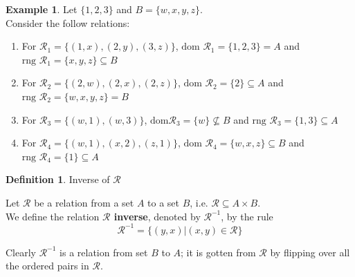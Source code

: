 \documentclass{book}
\theoremstyle{definition}
\newtheorem{definition}{Definition}[section]
\newtheorem{example}{Example}[definition]
\theoremstyle{remark}
\newcommand{\cc}[1]{\mathcal{#1}}
\begin{document}
    \begin{example}
        Let $\{ 1,2,3 \}$ and $B = \{w,x,y,z \}$. \\
        
        Consider the follow relations: 
            \begin{enumerate}
                \item For $\cc{R}_1 = \{ (1,x), (2,y), (3,z) \}$, $\text{dom } \cc{R}_1 = \{1, 2, 3 \} = A$ and $\text{rng } \cc{R}_1 = \{x, y, z \} \subseteq B$
                
                \item For $\cc{R}_2 = \{ (2,w), (2,x), (2,z) \}$, $\text{dom } \cc{R}_2 = \{2 \} \subseteq A$ and $\text{rng } \cc{R}_2 = \{w, x, y, z \} = B$
                
                \item For $\cc{R}_3 = \{ (w,1), (w,3) \}$, $\text{dom} \cc{R}_3 = \{w \} \nsubseteq B$ and $\text{rng } \cc{R}_3 = \{1, 3 \} \subseteq A$ 
                
                \item For $\cc{R}_4 = \{ (w,1), (x,2), (z,1) \}$, $\text{dom } \cc{R}_4 = \{w, x, z \} \subseteq B$ and $\text{rng } \cc{R}_4 = \{1 \} \subseteq A$
            \end{enumerate}
                
    \end{example}


    \begin{definition} 
        Inverse of $\cc{R}$ \\
        
        \begin{tcolorbox}      
            Let $\cc{R}$ be a relation from a set $A$ to a set $B$, i.e. $\cc{R} \subseteq A \times B$. \\
            We define the relation \textbf{$\cc{R}$ inverse}, denoted by $\cc{R}^{-1}$, by the rule
                \begin{equation*}
                    \cc{R}^{-1} = \{ (y,x) | (x,y) \in \cc{R} \}
                \end{equation*}
        \end{tcolorbox} 
    \end{definition}

    Clearly $\cc{R}^{-1}$ is a relation from set $B$ to $A$; it is gotten from $\cc{R}$ by flipping over all the ordered pairs in $\cc{R}$. 
\end{document}
